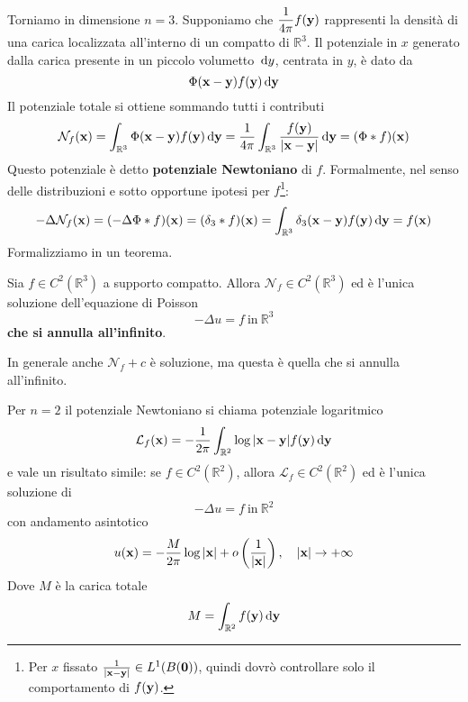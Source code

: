 Torniamo in dimensione $n=3$. Supponiamo che $\displaystyle \frac{1}{4\pi } f(\mathbf{y})$ rappresenti la densità di una carica localizzata all'interno di un compatto di $\displaystyle \mathbb{R}^{3}$. Il potenziale in $x$ generato dalla carica presente in un piccolo volumetto $\,\mathrm d y$, centrata in $y$, è dato da
\begin{equation*}
    \Phi (\mathbf{x}-\mathbf{y}) f(\mathbf{y}) \,\mathrm d \mathbf{y}
\end{equation*}
Il potenziale totale si ottiene sommando tutti i contributi
\begin{equation}
    \mathcal{N}_{f}(\mathbf{x}) =\int _{\mathbb{R}^{3}} \Phi (\mathbf{x}-\mathbf{y}) f(\mathbf{y}) \,\mathrm d \mathbf{y}=\frac{1}{4\pi }\int _{\mathbb{R}^{3}}\frac{f(\mathbf{y})}{|\mathbf{x}-\mathbf{y}| } \,\mathrm d \mathbf{y}=(\Phi \ast f)(\mathbf{x})
\end{equation}
Questo potenziale è detto \textbf{potenziale Newtoniano} di $f$. Formalmente, nel senso delle distribuzioni e sotto opportune ipotesi per $f$\footnote{Per $x$ fissato $\frac{1}{|\mathbf{x}-\mathbf{y}| } \in L^{1}(B(\mathbf{0}))$, quindi dovrò controllare solo il comportamento di $f(\mathbf{y})$.}:
\begin{equation*}
    -\Delta \mathcal{N}_{f}(\mathbf{x}) =(-\Delta \Phi \ast f)(\mathbf{x}) =(\delta _{3} \ast f)(\mathbf{x}) =\int _{\mathbb{R}^{3}} \delta _{3}(\mathbf{x}-\mathbf{y}) f(\mathbf{y}) \,\mathrm d \mathbf{y}=f(\mathbf{x})
\end{equation*}
Formalizziamo in un teorema.
\begin{theorem}
    Sia $\displaystyle f\in C^{2}\left(\mathbb{R}^{3}\right)$ a supporto compatto. Allora $\displaystyle \mathcal{N}_{f} \in C^{2}\left(\mathbb{R}^{3}\right)$ ed è l'unica soluzione dell'equazione di Poisson
    \begin{equation*}
        -\Delta u=f\ \text{in} \ \mathbb{R}^{3}
    \end{equation*}
    \textbf{che si annulla all'infinito}.
\end{theorem}
In generale anche $\mathcal{N}_{f}+c$ è soluzione, ma questa è quella che si annulla all'infinito.
\begin{nb}
    Per $n=2$ il potenziale Newtoniano si chiama potenziale logaritmico
    \begin{equation}
        \mathcal{L}_{f}(\mathbf{x}) =-\frac{1}{2\pi }\int _{\mathbb{R}^{2}}\log|\mathbf{x}-\mathbf{y}| f(\mathbf{y}) \,\mathrm d \mathbf{y}
    \end{equation}
    e vale un risultato simile: se $\displaystyle f\in C^{2}(\mathbb{R}^{2})$, allora $\displaystyle \mathcal{L}_{f} \in C^{2}(\mathbb{R}^{2})$ ed è l'unica soluzione di
    \begin{equation*}
        -\Delta u=f\ \text{in} \ \mathbb{R}^{2}
    \end{equation*}
    con andamento asintotico
    \begin{equation*}
        u(\mathbf{x}) =-\frac{M}{2\pi }\log|\mathbf{x}| +o\left(\frac{1}{|\mathbf{x}| }\right),\quad |\mathbf{x}| \rightarrow +\infty
    \end{equation*}
    Dove $M$ è la carica totale
    \begin{equation*}
        M=\int _{\mathbb{R}^{2}} f(\mathbf{y}) \,\mathrm d \mathbf{y}
    \end{equation*}
\end{nb}
